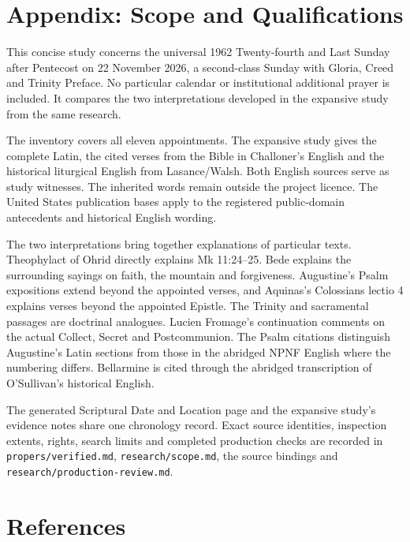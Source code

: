 \section{Appendix: Scope and Qualifications}

This concise study concerns the universal 1962 Twenty-fourth and Last
Sunday after Pentecost on 22 November 2026, a second-class Sunday with
Gloria, Creed and Trinity Preface. No particular calendar or institutional
additional prayer is included. It compares the two interpretations developed
in the expansive study from the same research.

The inventory covers all eleven appointments. The expansive study gives
the complete Latin, the cited verses from the Bible in Challoner's English
and the historical liturgical English from Lasance/Walsh. Both English
sources serve as study witnesses. The inherited words remain outside the
project licence. The United States publication bases apply to the
registered public-domain antecedents and historical English wording.

The two interpretations bring together explanations of particular texts.
Theophylact of Ohrid directly explains Mk 11:24--25. Bede explains the
surrounding sayings on faith, the mountain and forgiveness. Augustine's
Psalm expositions extend beyond the appointed verses, and Aquinas's
Colossians lectio 4 explains verses beyond the appointed Epistle. The
Trinity and sacramental passages are doctrinal analogues. Lucien Fromage's
continuation comments on the actual Collect, Secret and Postcommunion.
The Psalm citations distinguish Augustine's Latin sections from those in
the abridged NPNF English where the numbering differs. Bellarmine is cited
through the abridged transcription of O'Sullivan's historical English.

The generated Scriptural Date and Location page and the expansive study's
evidence notes share one chronology record. Exact source identities,
inspection extents, rights, search limits and completed production checks
are recorded in \texttt{propers/verified.md}, \texttt{research/scope.md},
the source bindings and \texttt{research/production-review.md}.

\section{References}


